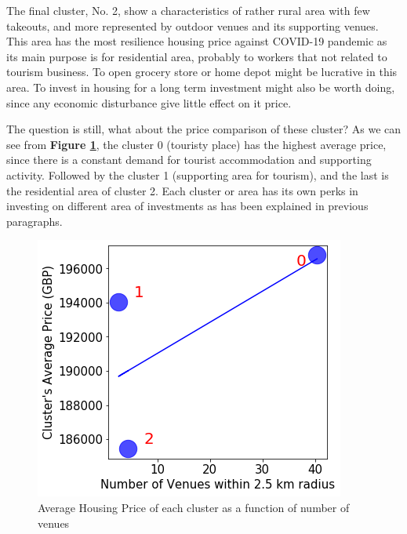 \documentclass{homeworg}
\begin{document}
The final cluster, No. 2, show a characteristics of rather rural area with few takeouts, and more represented by outdoor venues and its supporting venues. This area has the most resilience housing price against COVID-19 pandemic as its main purpose is for residential area, probably to workers that not related to tourism business. To open grocery store or home depot might be lucrative in this area. To invest in housing for a long term investment might also be worth doing, since any economic disturbance give little effect on it price. \par
The question is still, what about the price comparison of these cluster? As we can see from \textbf{Figure \ref{fig:clustPrice}}, the cluster 0 (touristy place) has the highest average price, since there is a constant demand for tourist accommodation and supporting activity. Followed by the cluster 1 (supporting area for tourism), and the last is the residential area of cluster 2. Each cluster or area has its own perks in investing on different area of investments as has been explained in previous paragraphs.\par
\begin{figure}[!ht]
    \centering
    \includegraphics[scale=0.7]{figure/Clusters_Average_Price.png}
    \caption{Average Housing Price of each cluster as a function of number of venues}
    \label{fig:clustPrice}
\end{figure}
\end{document}
